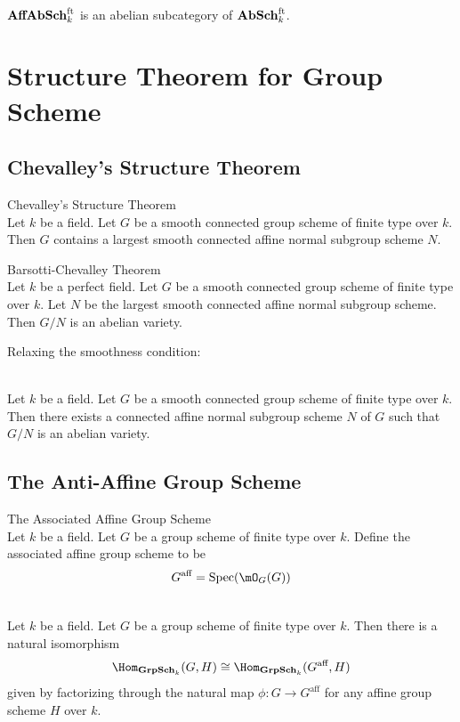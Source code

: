 \documentclass[a4paper]{article}
\begin{document}
\begin{prp}{}{}\\
$\bold{AffAbSch}_k^\text{ft}$ is an abelian subcategory of $\bold{AbSch}_k^\text{ft}$. 
\end{prp}

\pagebreak
\section{Structure Theorem for Group Scheme}
\subsection{Chevalley's Structure Theorem}
\begin{thm}{Chevalley's Structure Theorem}{}\\
Let $k$ be a field. Let $G$ be a smooth connected group scheme of finite type over $k$. Then $G$ contains a largest smooth connected affine normal subgroup scheme $N$. 
\end{thm}

\begin{thm}{Barsotti-Chevalley Theorem}{}\\
Let $k$ be a perfect field. Let $G$ be a smooth connected group scheme of finite type over $k$. Let $N$ be the largest smooth connected affine normal subgroup scheme. Then $G/N$ is an abelian variety. 
\end{thm}

Relaxing the smoothness condition: 

\begin{thm}{}{}\\
Let $k$ be a field. Let $G$ be a smooth connected group scheme of finite type over $k$. Then there exists a connected affine normal subgroup scheme $N$ of $G$ such that $G/N$ is an abelian variety. 
\end{thm}

\subsection{The Anti-Affine Group Scheme}
\begin{defn}{The Associated Affine Group Scheme}{}\\
Let $k$ be a field. Let $G$ be a group scheme of finite type over $k$. Define the associated affine group scheme to be $$G^\text{aff}=\text{Spec}(\mO_G(G))$$
\end{defn}

\begin{prp}{}{}\\
Let $k$ be a field. Let $G$ be a group scheme of finite type over $k$. Then there is a natural isomorphism $$\Hom_{\bold{GrpSch}_k}(G,H)\cong\Hom_{\bold{GrpSch}_k}(G^\text{aff},H)$$ given by factorizing through the natural map $\phi:G\to G^\text{aff}$ for any affine group scheme $H$ over $k$. 
\end{prp}
\end{document}
